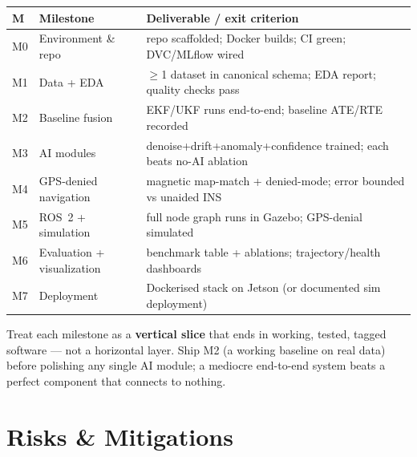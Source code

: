 \documentclass[11pt]{article}
\begin{document}
\begin{center}\footnotesize
\begin{tabular}{@{}p{1.1cm}p{4.6cm}p{6.4cm}@{}}
\toprule
\textbf{M} & \textbf{Milestone} & \textbf{Deliverable / exit criterion}\\
\midrule
M0 & Environment \& repo & repo scaffolded; Docker builds; CI green; DVC/MLflow wired\\
M1 & Data + EDA & $\ge$1 dataset in canonical schema; EDA report; quality checks pass\\
M2 & Baseline fusion & EKF/UKF runs end-to-end; baseline ATE/RTE recorded\\
M3 & AI modules & denoise+drift+anomaly+confidence trained; each beats no-AI ablation\\
M4 & GPS-denied navigation & magnetic map-match + denied-mode; error bounded vs unaided INS\\
M5 & ROS~2 + simulation & full node graph runs in Gazebo; GPS-denial simulated\\
M6 & Evaluation + visualization & benchmark table + ablations; trajectory/health dashboards\\
M7 & Deployment & Dockerised stack on Jetson (or documented sim deployment)\\
\bottomrule
\end{tabular}
\end{center}

\begin{defbox}
Treat each milestone as a \textbf{vertical slice} that ends in working, tested, tagged software
--- not a horizontal layer. Ship M2 (a working baseline on real data) before polishing any single
AI module; a mediocre end-to-end system beats a perfect component that connects to nothing.
\end{defbox}

\section{Risks \& Mitigations}\label{sec:risks}
\end{document}
